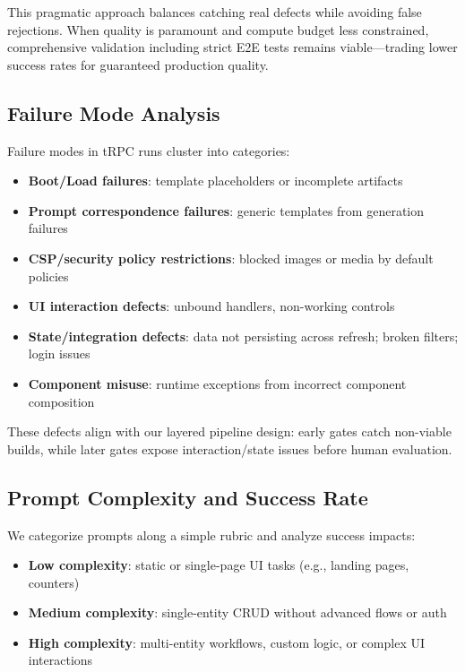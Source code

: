\documentclass[conference]{IEEEtran}
\begin{document}
This pragmatic approach balances catching real defects while avoiding false rejections. When quality is paramount and compute budget less constrained, comprehensive validation including strict E2E tests remains viable—trading lower success rates for guaranteed production quality.

\subsection{Failure Mode Analysis}

Failure modes in tRPC runs cluster into categories:

\begin{itemize}
\item \textbf{Boot/Load failures}: template placeholders or incomplete artifacts
\item \textbf{Prompt correspondence failures}: generic templates from generation failures
\item \textbf{CSP/security policy restrictions}: blocked images or media by default policies
\item \textbf{UI interaction defects}: unbound handlers, non-working controls
\item \textbf{State/integration defects}: data not persisting across refresh; broken filters; login issues
\item \textbf{Component misuse}: runtime exceptions from incorrect component composition
\end{itemize}

These defects align with our layered pipeline design: early gates catch non-viable builds, while later gates expose interaction/state issues before human evaluation.

\subsection{Prompt Complexity and Success Rate}
\label{sec:prompt-complexity}

We categorize prompts along a simple rubric and analyze success impacts:

\begin{itemize}
\item \textbf{Low complexity}: static or single-page UI tasks (e.g., landing pages, counters)
\item \textbf{Medium complexity}: single-entity CRUD without advanced flows or auth
\item \textbf{High complexity}: multi-entity workflows, custom logic, or complex UI interactions
\end{itemize}
\end{document}
